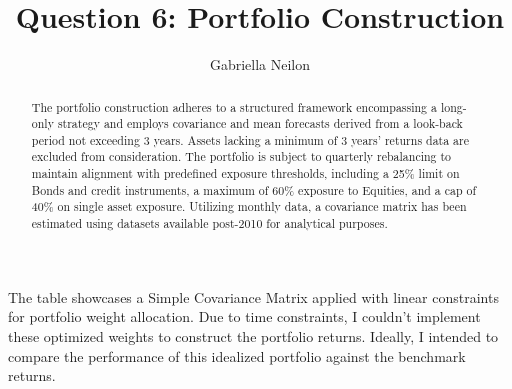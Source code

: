 \documentclass[11pt,preprint, authoryear]{elsarticle}
\numberwithin{equation}{section}
\numberwithin{figure}{section}
\numberwithin{table}{section}
\begin{document}
\begin{frontmatter}  %

\title{Question 6: Portfolio Construction}





\author[Add1]{Gabriella Neilon}





\address[Add1]{Stellenbosch University}


\begin{abstract}
\small{
The portfolio construction adheres to a structured framework
encompassing a long-only strategy and employs covariance and mean
forecasts derived from a look-back period not exceeding 3 years. Assets
lacking a minimum of 3 years' returns data are excluded from
consideration. The portfolio is subject to quarterly rebalancing to
maintain alignment with predefined exposure thresholds, including a 25\%
limit on Bonds and credit instruments, a maximum of 60\% exposure to
Equities, and a cap of 40\% on single asset exposure. Utilizing monthly
data, a covariance matrix has been estimated using datasets available
post-2010 for analytical purposes.
}
\end{abstract}

\vspace{1cm}





\vspace{0.5cm}

\end{frontmatter}

\setcounter{footnote}{0}



\pagestyle{fancy}
\chead{}
\rhead{}
\lfoot{}
\lhead{}
\cfoot{}


\headsep 35pt %




The table showcases a Simple Covariance Matrix applied with linear
constraints for portfolio weight allocation. Due to time constraints, I
couldn't implement these optimized weights to construct the portfolio
returns. Ideally, I intended to compare the performance of this
idealized portfolio against the benchmark returns.
\end{document}
